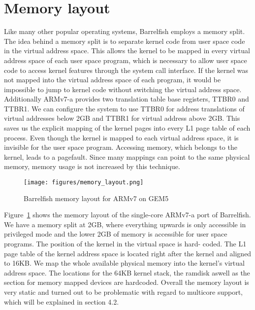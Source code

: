 \documentclass[a4paper,twoside]{report} %
\begin{document}
\section{Memory layout}

Like many other popular operating systems, Barrelfish employs a memory
split. The idea behind a memory split is to separate kernel code from
user space code in the virtual address space. This allows the kernel
to be mapped in every virtual address space of each user space
program, which is necessary to allow user space code to access kernel
features through the system call interface. If the kernel was not
mapped into the virtual address space of each program, it would be
impossible to jump to kernel code without switching the virtual
address space. Additionally ARMv7-a provides two translation table
base registers, TTBR0 and TTBR1. We can configure the system to use
TTBR0 for address translations of virtual addresses below 2GB and
TTBR1 for virtual address above 2GB. This saves us the explicit
mapping of the kernel pages into every L1 page table of each process.
Even though the kernel is mapped to each virtual address space, it is
invisible for the user space program. Accessing memory, which belongs
to the kernel, leads to a pagefault. Since many mappings can point to
the same physical memory, memory usage is not increased by this
technique.

\begin{figure}[htb]
  \centering
  \texttt{[image: figures/memory\_layout.png]}
  \caption{Barrelfish memory layout for ARMv7 on GEM5}
  \label{fig:memory_layout}
\end{figure}

Figure~\ref{fig:memory_layout} shows the memory layout of the
single-core ARMv7-a port of Barrelfish. We have a memory split at 2GB,
where everything upwards is only accessible in privileged mode and the
lower 2GB of memory is accessible for user space programs. The
position of the kernel in the virtual space is hard- coded. The L1
page table of the kernel address space is located right after the
kernel and aligned to 16KB. We map the whole available physical memory
into the kernel’s virtual address space. The locations for the 64KB
kernel stack, the ramdisk aswell as the section for memory mapped
devices are hardcoded.  Overall the memory layout is very static and
turned out to be problematic with regard to multicore support, which
will be explained in section 4.2.
\end{document}
